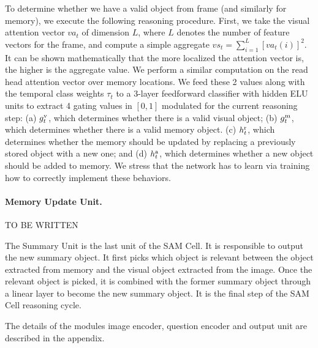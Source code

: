 To determine whether we have a valid object from frame (and similarly for memory), we execute the following reasoning procedure.
First, we take the visual attention vector $va_t$ of dimension $L$, where $L$ denotes the number of feature vectors for the frame,
and compute a simple aggregate $vs_t = \sum_{i=1}^L [va_t(i)]^2$. It can be shown mathematically that the more localized the attention
vector is, the higher is the aggregate value.
We perform a similar computation on the read head attention vector over memory locations.
We feed these 2 values along with the temporal class weights $\tau_t$ to a 3-layer feedforward classifier with hidden ELU units to extract 4 gating values
in $[0,1]$ modulated for the current reasoning step:
(a) $g^{\mathrm{v}}_t$, which determines whether there is a valid visual object;
(b) $g^{\mathrm{m}}_t$, which determines whether there is a valid memory object. 
(c) $h^{\mathrm{r}}_t$, which determines whether the memory should be updated by replacing a previously stored object with a new one; and
(d) $h^{\mathrm{a}}_t$, which determines whether a new object should be added to memory.
We stress that the network has to learn via training how to correctly implement these behaviors.

\paragraph{Memory Update Unit.}

%
%
%

TO BE WRITTEN


The  Summary Unit is the last unit of the SAM Cell. It is responsible to output the new summary object. It first picks which object is relevant between the object extracted from memory and the visual object extracted from the image. Once the relevant object is picked, it is combined with the former summary object through a linear layer to become the new summary object. It is the final step of the SAM Cell reasoning cycle. 

The details of the modules image encoder, question encoder and output unit are described in the appendix.
